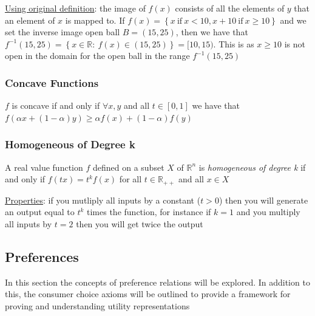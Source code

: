 \documentclass{article}
\begin{document}
  \par
  \underline{Using original definition}: the image of $f(x)$ consists of all the elements of $y$ that an element of $x$ is mapped to. If $f(x) = \left\{x \ \text{if} \ x < 10, x + 10 \ \text{if} \ x \geq 10 \right\}$ and we set the inverse image open ball $B = (15, 25)$, then  we have that $f^{-1}(15,25) = \left\{ x \in \mathbb{R}: \ f(x) \in (15, 25) \right\} = [10, 15)$. This is as $x \geq 10$ is not open in the domain for the open ball in the range $f^{-1}(15,25)$
  \par
\vspace{6mm}
\subsubsection{Concave Functions}
$f$ is concave if and only if $\forall x,y$ and all $t \in [0,1]$ we have that $f(\alpha x + (1-\alpha)y) \geq \alpha f(x) + (1-\alpha)f(y) $\par \vspace{0.3em}
\subsubsection{Homogeneous of Degree k}
A real value function $f$ defined on a subset $X$ of $\mathbb{R}^{n}$ is \textit{homogeneous of degree k} if and only if $f(tx) = t^{k}f(x)$ for all $t \in \mathbb{R}_{++}$ and all $x \in X$ \par \vspace{0.3em}
  \underline{Properties}: if you mutliply all inputs by a constant ($t > 0$) then you will generate an output equal to $t^{k}$ times the function, for instance if $k=1$ and you multiply all inputs by $t=2$ then you will get twice the output

\newpage

\vspace{2.5mm}
\subsection{Preferences}
In this section the concepts of preference relations will be explored. In addition to this, the consumer choice axioms will be outlined to provide a framework for proving and understanding utility representations \par
\vspace{6mm}
\end{document}
